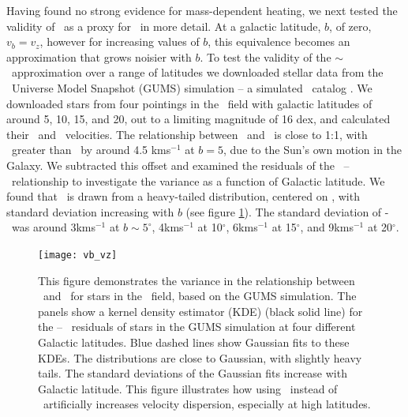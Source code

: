 Having found no strong evidence for mass-dependent heating, we next tested
the validity of \vb\ as a proxy for \vz\ in more detail.
At a galactic latitude, $b$, of zero, $v_b=v_z$, however for increasing values
of $b$, this equivalence becomes an approximation that grows noisier with $b$.
To test the validity of the \vb$\sim$\vz\ approximation over a range of
latitudes we downloaded stellar data from the \Gaia\ Universe Model Snapshot
(GUMS) simulation -- a simulated \Gaia\ catalog \citep{robin2012}.
We downloaded stars from four pointings in the \kepler\ field with galactic
latitudes of around 5\degrees, 10\degrees, 15\degrees, and 20\degrees, out to
a limiting magnitude of 16 dex, and calculated their \vz\ and \vb\ velocities.
The relationship between \vz\ and \vb\ is close to 1:1, with \vz\ greater than
\vb\ by around 4.5 kms$^{-1}$ at $b=5$, due to the Sun's own motion in the
Galaxy.
We subtracted this offset and examined the residuals of the \vz\ -- \vb\
relationship to investigate the variance as a function of Galactic latitude.
We found that \vb\ is drawn from a heavy-tailed distribution, centered on \vz,
with standard deviation increasing with $b$ (see figure \ref{fig:vb_vz}).
The standard deviation of \vz-\vb\ was around 3kms$^{-1}$ at $b \sim 5^\circ
$, 4kms$^{-1}$ at 10$^\circ$, 6kms$^{-1}$ at 15$^\circ$, and 9kms$^{-1}$ at
20$^\circ$.

\begin{figure}
  \caption{
This figure demonstrates the variance in the relationship between \vb\ and
    \vz\ for stars in the \kepler\ field, based on the GUMS simulation.
The panels show a kernel density estimator (KDE) (black solid line) for
    the \vz -- \vb\ residuals of stars in the GUMS simulation at four
    different Galactic latitudes.
Blue dashed lines show Gaussian fits to these KDEs.
The distributions are close to Gaussian, with slightly heavy tails.
The standard deviations of the Gaussian fits increase with Galactic latitude.
This figure illustrates how using \vb\ instead of \vz\ artificially
    increases velocity dispersion, especially at high latitudes.
}
  \centering
    \texttt{[image: vb\_vz]}
\label{fig:vb_vz}
\end{figure}

